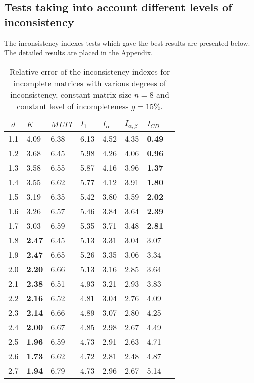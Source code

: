 \subsection{Tests taking into account different levels of inconsistency}
The inconsistency indexes tests which gave the best results are presented below. The detailed results are placed in the Appendix.
\begin{table}[!]
\begin{center}
\caption{Relative error of the inconsistency indexes for incomplete matrices with various degrees of inconsistency, constant matrix size $n=8$ and constant level of incompleteness $g=15\%$.}
\label{tab:results1}
\begin{tabular}{|c||lllll||l|c|}
\hline $d$ & $K$ & $MLTI$ & $I_1$ & $I_{\alpha}$ & $I_{\alpha,\beta}$ & $I_{CD}$  \\ \hline \hline
1.1 & 4.09 & 6.38 & 6.13 & 4.52 & 4.35 & \textbf{0.49} \\ \hline
1.2 & 3.68 & 6.45 & 5.98 & 4.26 & 4.06 & \textbf{0.96} \\ \hline
1.3 & 3.58 & 6.55 & 5.87 & 4.16 & 3.96 & \textbf{1.37} \\ \hline
1.4 & 3.55 & 6.62 & 5.77 & 4.12 & 3.91 & \textbf{1.80} \\ \hline
1.5 & 3.19 & 6.35 & 5.42 & 3.80 & 3.59 & \textbf{2.02} \\ \hline
1.6 & 3.26 & 6.57 & 5.46 & 3.84 & 3.64 & \textbf{2.39} \\ \hline
1.7 & 3.03 & 6.59 & 5.35 & 3.71 & 3.48 & \textbf{2.81} \\ \hline
1.8 & \textbf{2.47} & 6.45 & 5.13 & 3.31 & 3.04 & 3.07 \\ \hline
1.9 & \textbf{2.47} & 6.65 & 5.26 & 3.35 & 3.06 & 3.34 \\ \hline
2.0 & \textbf{2.20} & 6.66 & 5.13 & 3.16 & 2.85 & 3.64 \\ \hline
2.1 & \textbf{2.38} & 6.51 & 4.93 & 3.21 & 2.93 & 3.83 \\ \hline
2.2 & \textbf{2.16} & 6.52 & 4.81 & 3.04 & 2.76 & 4.09 \\ \hline
2.3 & \textbf{2.14} & 6.66 & 4.89 & 3.07 & 2.80 & 4.25 \\ \hline
2.4 & \textbf{2.00} & 6.67 & 4.85 & 2.98 & 2.67 & 4.49 \\ \hline
2.5 & \textbf{1.96} & 6.59 & 4.73 & 2.91 & 2.63 & 4.71 \\ \hline
2.6 & \textbf{1.73} & 6.62 & 4.72 & 2.81 & 2.48 & 4.87 \\ \hline
2.7 & \textbf{1.94} & 6.79 & 4.73 & 2.96 & 2.67 & 5.14 \\ \hline

\end{tabular}
\end{center}
\end{table}
